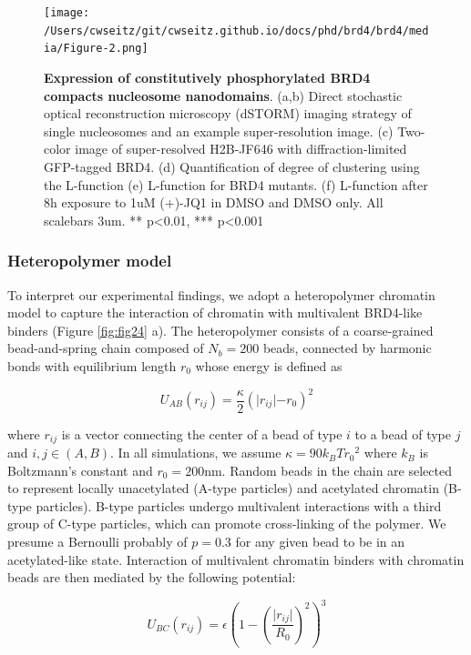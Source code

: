 \begin{figure}[t]
\texttt{[image: /Users/cwseitz/git/cwseitz.github.io/docs/phd/brd4/brd4/media/Figure-2.png]}
\caption{\textbf{Expression of constitutively phosphorylated BRD4 compacts nucleosome nanodomains}. (a,b) Direct stochastic optical reconstruction microscopy (dSTORM) imaging strategy of single nucleosomes and an example super-resolution image. (c) Two-color image of super-resolved H2B-JF646 with diffraction-limited GFP-tagged BRD4. (d) Quantification of degree of clustering using the L-function (e) L-function for BRD4 mutants. (f) L-function after 8h exposure to 1uM (+)-JQ1 in DMSO and DMSO only. All scalebars 3um. ** p<0.01, *** p<0.001}
\label{fig:fig25}
\end{figure}

\subsubsection{Heteropolymer model}

To interpret our experimental findings, we adopt a heteropolymer chromatin model to capture the interaction of chromatin with multivalent BRD4-like binders (Figure \ref{fig:fig24} a). The heteropolymer consists of a coarse-grained bead-and-spring chain composed of $N_b=200$ beads, connected by harmonic bonds with equilibrium length $r_0$ whose energy is deﬁned as

\begin{equation*}
U_{AB}(r_{ij})=\frac{\kappa}{2}(\lvert r_{ij}\lvert-r_0)^2
\end{equation*}

where $r_{ij}$ is a vector connecting the center of a bead of type $i$ to a bead of type $j$ and $i,j \in (A,B)$. In all simulations, we assume $\kappa=90k_{B}T{r_0}^2$ where $k_{B}$ is Boltzmann’s constant and $r_0=200$nm. Random beads in the chain are selected to represent locally unacetylated (A-type particles) and acetylated chromatin (B-type particles).  B-type particles undergo multivalent interactions with a third group of C-type particles, which can promote cross-linking of the polymer. We presume a Bernoulli probably of $p=0.3$ for any given bead to be in an acetylated-like state. Interaction of multivalent chromatin binders with chromatin beads are then mediated by the following potential:

\begin{equation*}
U_{BC}\left(r_{ij}\right)=\epsilon\left(1-\left(\frac{\lvert r_{ij}\lvert}{R_0}\right)^2\right)^3
\end{equation*}

